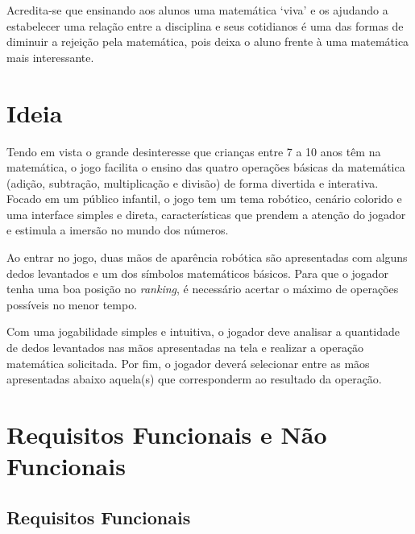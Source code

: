 \documentclass[
    12pt,               %
    openany,          	%
    twoside,            %
    a4paper,            %
    brazil              %
    ]{abntex2}
\begin{document}
Acredita-se que ensinando aos alunos uma matemática `viva' e os ajudando a
estabelecer uma relação entre a disciplina e seus cotidianos é uma das formas
de diminuir a rejeição pela matemática, pois deixa o aluno frente à uma
matemática mais interessante.

\chapter{Ideia}

Tendo em vista o grande desinteresse que crianças entre 7 a 10 anos têm na
matemática, o jogo facilita o ensino das quatro operações básicas da matemática
(adição, subtração, multiplicação e divisão) de forma divertida e interativa.
Focado em um público infantil, o jogo tem um tema robótico, cenário colorido e
uma interface simples e direta, características que prendem a atenção do
jogador e estimula a imersão no mundo dos números.

Ao entrar no jogo, duas mãos de aparência robótica são apresentadas com alguns
dedos levantados e um dos símbolos matemáticos básicos. Para que o jogador
tenha uma boa posição no \textit{ranking}, é necessário acertar o máximo de
operações possíveis no menor tempo.

Com uma jogabilidade simples e intuitiva, o jogador deve analisar a quantidade
de dedos levantados nas mãos apresentadas na tela e realizar a operação
matemática solicitada. Por fim, o jogador deverá selecionar entre as mãos
apresentadas abaixo aquela(s) que corresponderm ao resultado da operação.

\chapter{Requisitos Funcionais e Não Funcionais}

\section{Requisitos Funcionais}
\end{document}
